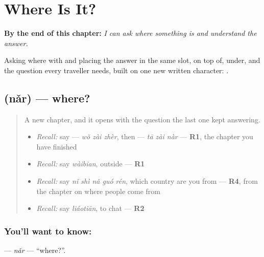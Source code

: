 
\chapter{Where Is It?}
\label{ch:zh-where-is-it}

\begin{chapteropening}
\textbf{By the end of this chapter:} \emph{I can ask where something is and understand the answer.}

Asking where with  and placing the answer in the same slot, on top of, under, and the question every traveller needs, built on one new written character: .
\end{chapteropening}

\section[\texorpdfstring{\zh{哪儿} (nǎr)}{哪儿 (nǎr)}]{ (nǎr) — where?}

\label{lesson:ZH-C86-nar-where}



\begin{quote}
A new chapter, and it opens with the question the last one kept answering.

\begin{itemize}
\raggedright
  \item \emph{Recall:} say  — \emph{wǒ zài zhèr}, then  — \emph{tā zài nàr} — \textbf{R1}, the chapter you have finished
  \item \emph{Recall:} say \emph{wàibian}, outside — \textbf{R1}
  \item \emph{Recall:} say \emph{nǐ shì nǎ guó rén}, which country are you from — \textbf{R4}, from the chapter on where people come from
  \item \emph{Recall:} say \emph{liáotiān}, to chat — \textbf{R2}
\end{itemize}
\end{quote}

\subsection*{You'll want to know: }
\textbf{} — \emph{nǎr} — \textquotedblleft{}where?\textquotedblright{}.

